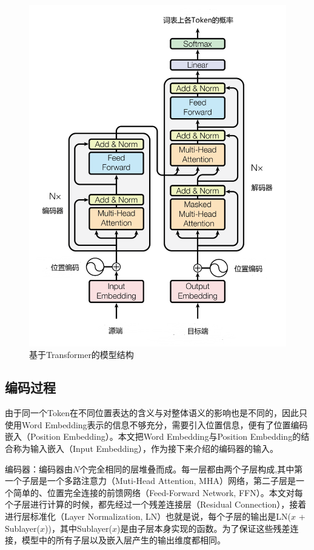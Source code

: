 \begin{figure}[h]
	\centering
	\includegraphics[width=0.8\linewidth]{figures/Transformer_Structure.png}
	\caption{基于Transformer的模型结构\cite{Attn_is_all_you_need}}
	\label{Transformer_Structure}
\end{figure}

\subsection{编码过程}

由于同一个Token在不同位置表达的含义与对整体语义的影响也是不同的，因此只使用Word Embedding表示的信息不够充分，需要引入位置信息，便有了位置编码嵌入（Position Embedding）。本文把Word Embedding与Position Embedding的结合称为输入嵌入（Input Embedding），作为接下来介绍的编码器的输入。

编码器：编码器由$N$个完全相同的层堆叠而成。每一层都由两个子层构成,其中第一个子层是一个多路注意力（Muti-Head Attention, MHA）网络，第二子层是一个简单的、位置完全连接的前馈网络（Feed-Forward Network, FFN）。本文对每个子层进行计算的时候，都先经过一个残差连接层（Residual Connection），接着进行层标准化（Layer Normalization, LN）也就是说，每个子层的输出是LN($x$ + Sublayer($x$))，其中Sublayer($x$)是由子层本身实现的函数。为了保证这些残差连接，模型中的所有子层以及嵌入层产生的输出维度都相同。

